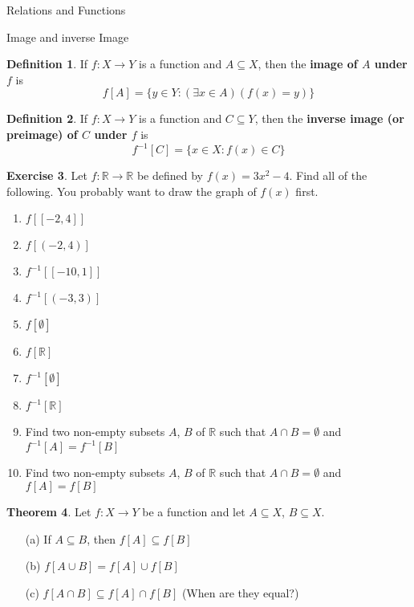 \documentclass[11pt]{article}
\theoremstyle{definition}
\newtheorem{theorem}{Theorem}[section]
\newtheorem{definition}[theorem]{Definition}
\newtheorem{exercise}[theorem]{Exercise}
\begin{document}
\addtocounter{section}{5}

\begin{section}{Relations and Functions}

\addtocounter{subsection}{5}
\addtocounter{theorem}{109}

\begin{subsection}{Image and inverse Image}

\begin{definition}
If $f:X\to Y$ is a function and $A\subseteq X$, then the \textbf{image of $A$ under $f$} is
$$f[A]=\{y\in Y: (\exists x\in A)(f(x)=y)\}$$
\end{definition}

\begin{definition}

If $f:X\to Y$ is a function and $C\subseteq Y$, then the
\textbf{inverse image (or preimage) of $C$ under $f$} is
$$f^{-1}[C]=\{x\in X: f(x)\in C\}$$

\end{definition}

\begin{exercise}

Let $f:\mathbb{R}\to\mathbb{R}$ be defined by $f(x)=3x^2-4$.
Find all of the following. You probably want to draw the graph
of $f(x)$ first.
\begin{enumerate}
\item $f[[-2,4]]$
\item $f[(-2,4)]$
\item $f^{-1}[[-10,1]]$
\item $f^{-1}[(-3,3)]$
\item $f[\emptyset]$
\item $f[\mathbb{R}]$
\item $f^{-1}[\emptyset]$
\item $f^{-1}[\mathbb{R}]$
\item Find two non-empty subsets $A$, $B$ of $\mathbb{R}$ such that $A\cap B=\emptyset$ and $f^{-1}[A]=f^{-1}[B]$
\item Find two non-empty subsets $A$, $B$ of $\mathbb{R}$ such that $A\cap B=\emptyset$ and $f[A]=f[B]$
\end{enumerate}

\end{exercise}

\begin{theorem}
Let $f:X\to Y$ be a function and let $A\subseteq X$, $B\subseteq X$.
\begin{enumerate}
\item[(a)] If $A\subseteq B$, then $f[A]\subseteq f[B]$
\item[(b)] $f[A\cup B]=f[A]\cup f[B]$
\item[(c)] $f[A\cap B]\subseteq f[A]\cap f[B]$ (When are they equal?)
\end{enumerate}
\end{theorem}


\end{subsection}
\end{section}
\end{document}
